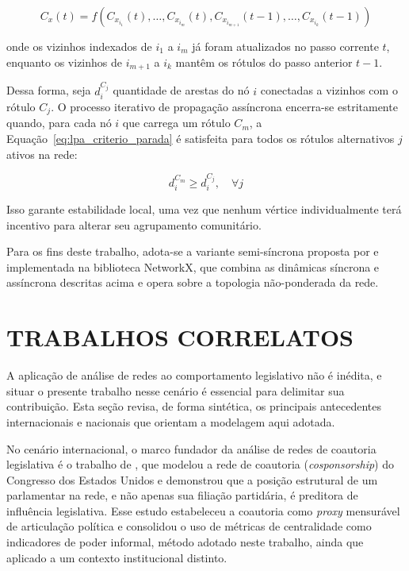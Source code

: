 \documentclass[
      12pt,
      a4paper,
      openright,
      oneside,
      chapter=TITLE,
      section=TITLE,
      english,
      french,
      spanish,
      brazilian
    ]{abntex2}
\begin{document}
    \begin{equation}
    C_x(t) = f\left( C_{x_{i_1}}(t), \dots, C_{x_{i_m}}(t), C_{x_{i_{m+1}}}(t-1), \dots, C_{x_{i_k}}(t-1) \right)
    \label{eq:lpa_assincrono}
    \end{equation}
    
    onde os vizinhos indexados de $i_1$ a $i_m$ já foram atualizados no passo corrente $t$, enquanto os vizinhos de $i_{m+1}$ a $i_k$ mantêm os rótulos do passo anterior $t-1$. 
    
    Dessa forma, seja $d_i^{C_j}$ quantidade de arestas do nó $i$ conectadas a vizinhos com o rótulo $C_j$. O processo iterativo de propagação assíncrona encerra-se estritamente quando, para cada nó $i$ que carrega um rótulo $C_m$, a Equação~\ref{eq:lpa_criterio_parada} é satisfeita para todos os rótulos alternativos $j$ ativos na rede:
    
    \begin{equation}
    d_i^{C_m} \ge d_i^{C_j}, \quad \forall j
    \label{eq:lpa_criterio_parada}
    \end{equation}
    
    Isso garante estabilidade local, uma vez que nenhum vértice individualmente terá incentivo para alterar seu agrupamento comunitário.

    Para os fins deste trabalho, adota-se a variante semi-síncrona proposta por  e implementada na biblioteca NetworkX, que combina as dinâmicas síncrona e assíncrona descritas acima e opera sobre a topologia não-ponderada da rede.
    
    \section{TRABALHOS CORRELATOS}
    
    A aplicação de análise de redes ao comportamento legislativo não é inédita, e situar o presente trabalho nesse cenário é essencial para delimitar sua contribuição. Esta seção revisa, de forma sintética, os principais antecedentes internacionais e nacionais que orientam a modelagem aqui adotada.
    
    No cenário internacional, o marco fundador da análise de redes de coautoria legislativa é o trabalho de , que modelou a rede de coautoria (\textit{cosponsorship}) do Congresso dos Estados Unidos e demonstrou que a posição estrutural de um parlamentar na rede, e não apenas sua filiação partidária, é preditora de influência legislativa. Esse estudo estabeleceu a coautoria como \textit{proxy} mensurável de articulação política e consolidou o uso de métricas de centralidade como indicadores de poder informal, método adotado neste trabalho, ainda que aplicado a um contexto institucional distinto.
    
\end{document}
